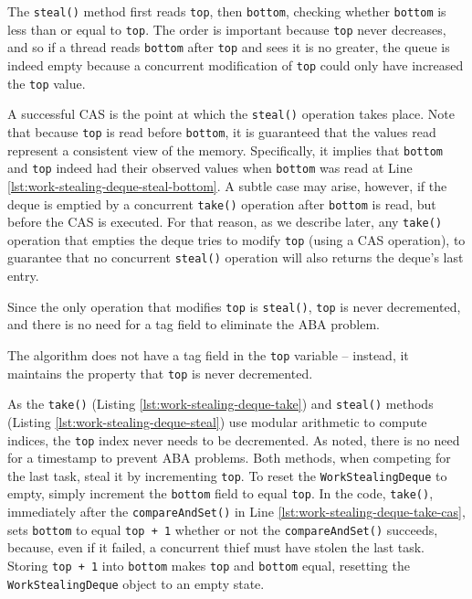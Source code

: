 The \lstinline!steal()! method first reads \lstinline!top!, then
\lstinline!bottom!, checking whether \lstinline!bottom! is less than
or equal to \lstinline!top!. The order is important because
\lstinline!top! never decreases, and so if a thread reads
\lstinline!bottom! after \lstinline!top! and sees it is no greater,
the queue is indeed empty because a concurrent modification of
\lstinline!top! could only have increased the \lstinline!top! value.

A successful CAS is the point at which the \lstinline!steal()!
operation takes place. Note that because \lstinline!top! is read
before \lstinline!bottom!, it is guaranteed that the values read
represent a consistent view of the memory. Specifically, it implies
that \lstinline!bottom! and \lstinline!top! indeed had their observed
values when \lstinline!bottom! was read at Line
\ref{lst:work-stealing-deque-steal-bottom}. A subtle case may arise,
however, if the deque is emptied by a concurrent \lstinline!take()!
operation after \lstinline!bottom! is read, but before the CAS is
executed. For that reason, as we describe later, any
\lstinline!take()!  operation that empties the deque tries to modify
\lstinline!top!  (using a CAS operation), to guarantee that no
concurrent \lstinline!steal()! operation will also returns the deque's
last entry.

Since the only operation that modifies \lstinline!top! is
\lstinline!steal()!, \lstinline!top! is never decremented, and there
is no need for a tag field to eliminate the ABA problem.

The algorithm does not have a tag field in the \lstinline!top!
variable -- instead, it maintains the property that \lstinline!top! is
never decremented.



As the \lstinline!take()! (Listing \ref{lst:work-stealing-deque-take})
and \lstinline!steal()!  methods (Listing
\ref{lst:work-stealing-deque-steal}) use modular arithmetic to compute
indices, the \lstinline!top! index never needs to be decremented. As
noted, there is no need for a timestamp to prevent ABA problems. Both
methods, when competing for the last task, steal it by incrementing
\lstinline!top!. To reset the \lstinline!WorkStealingDeque! to empty,
simply increment the \lstinline!bottom! field to equal
\lstinline!top!. In the code, \lstinline!take()!, immediately after
the \lstinline!compareAndSet()! in Line
\ref{lst:work-stealing-deque-take-cas}, sets \lstinline!bottom! to
equal \lstinline!top + 1! whether or not the
\lstinline!compareAndSet()! succeeds, because, even if it failed, a
concurrent thief must have stolen the last task. Storing
\lstinline!top + 1! into \lstinline!bottom! makes \lstinline!top! and
\lstinline!bottom! equal, resetting the \lstinline!WorkStealingDeque!
object to an empty state.

